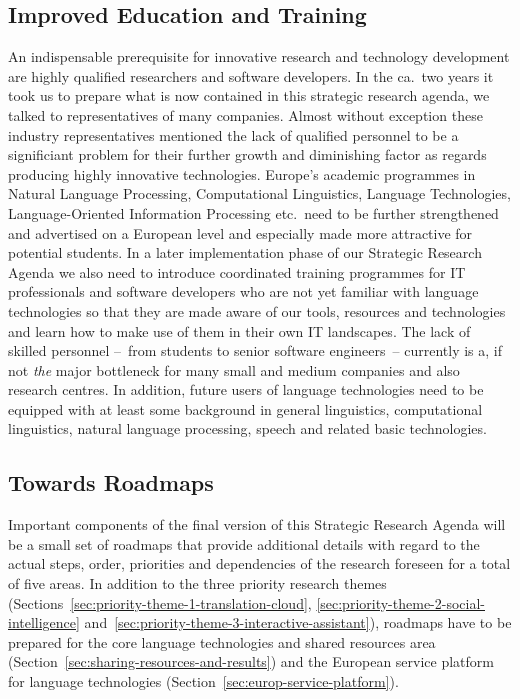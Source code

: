 \documentclass[10pt, plain]{../../metanetpaper}
\begin{document}
\begin{multicols}{2}
\subsection{Improved Education and Training}
\label{sec:improved-edu-and-training}

An indispensable prerequisite for innovative research and technology development are highly qualified researchers and software developers. In the ca.~two years it took us to prepare what is now contained in this strategic research agenda, we talked to representatives of many companies. Almost without exception these industry representatives mentioned the lack of qualified personnel to be a significiant problem for their further growth and diminishing factor as regards producing highly innovative technologies. Europe's academic programmes in Natural Language Processing, Computational Linguistics, Language Technologies, Language-Oriented Information Processing etc.~need to be further strengthened and advertised on a European level and especially made more attractive for potential students. In a later implementation phase of our Strategic Research Agenda we also need to introduce coordinated training programmes for IT professionals and software developers who are not yet familiar with language technologies so that they are made aware of our tools, resources and technologies and learn how to make use of them in their own IT landscapes. The lack of skilled personnel --~from students to senior software engineers~-- currently is a, if not \emph{the} major bottleneck for many small and medium companies and also research centres. In addition, future users of language technologies need to be equipped with at least some background in general linguistics, computational linguistics, natural language processing, speech and related basic technologies.

\subsection{Towards Roadmaps}
\label{sec:roadmaps}

Important components of the final version of this Strategic Research Agenda will be a small set of roadmaps that provide additional details with regard to the actual steps, order, priorities and dependencies of the research foreseen for a total of five areas. In addition to the three priority research themes (Sections~\ref{sec:priority-theme-1-translation-cloud}, \ref{sec:priority-theme-2-social-intelligence} and~\ref{sec:priority-theme-3-interactive-assistant}), roadmaps have to be prepared for the core language technologies and shared resources area (Section~\ref{sec:sharing-resources-and-results}) and the European service platform for language technologies (Section~\ref{sec:europ-service-platform}).


\end{multicols}
\end{document}

